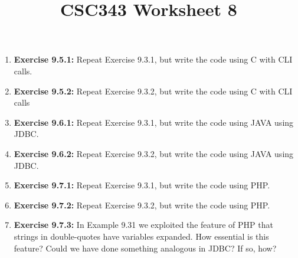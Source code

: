 \documentclass[12pt]{article}
\begin{document}
\title{CSC343 Worksheet 8}
\maketitle

\begin{enumerate}[1.]
    \item \textbf{Exercise 9.5.1:} Repeat Exercise 9.3.1, but write the code using C with CLI calls.
    \item \textbf{Exercise 9.5.2:} Repeat Exercise 9.3.2, but write the code using C with CLI calls
    \item \textbf{Exercise 9.6.1:} Repeat Exercise 9.3.1, but write the code using JAVA using JDBC.
    \item \textbf{Exercise 9.6.2:} Repeat Exercise 9.3.2, but write the code using JAVA using JDBC.
    \item \textbf{Exercise 9.7.1:} Repeat Exercise 9.3.1, but write the code using PHP.
    \item \textbf{Exercise 9.7.2:} Repeat Exercise 9.3.2, but write the code using PHP.
    \item \textbf{Exercise 9.7.3:} In Example 9.31 we exploited the feature of PHP that strings
    in double-quotes have variables expanded. How essential is this feature? Could
    we have done something analogous in JDBC? If so, how?
\end{enumerate}
\end{document}

